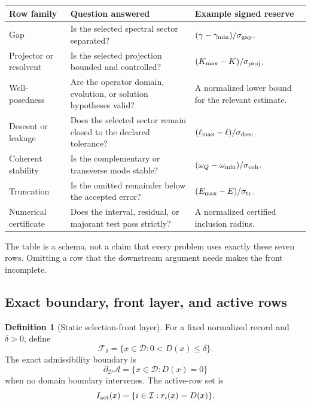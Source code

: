\documentclass[11pt]{article}
\theoremstyle{definition}
\newtheorem{definition}[theorem]{Definition}
\theoremstyle{remark}
\newcommand{\cA}{\mathcal A}
\newcommand{\cD}{\mathcal D}
\newcommand{\cF}{\mathcal F}
\newcommand{\cI}{\mathcal I}
\begin{document}
\begin{center}
\begin{tabularx}{\textwidth}{@{}L{0.22\textwidth}Y Y@{}}
\toprule
Row family & Question answered & Example signed reserve \\
\midrule
Gap
& Is the selected spectral sector separated?
& \((\gamma-\gamma_{\min})/\sigma_{\rm gap}\).\\

Projector or resolvent
& Is the selected projection bounded and controlled?
& \((K_{\max}-K)/\sigma_{\rm proj}\).\\

Well-posedness
& Are the operator domain, evolution, or solution hypotheses valid?
& A normalized lower bound for the relevant estimate.\\

Descent or leakage
& Does the selected sector remain closed to the declared tolerance?
& \((\ell_{\max}-\ell)/\sigma_{\rm desc}\).\\

Coherent stability
& Is the complementary or transverse mode stable?
& \((\omega_Q-\omega_{\min})/\sigma_{\rm coh}\).\\

Truncation
& Is the omitted remainder below the accepted error?
& \((E_{\max}-E)/\sigma_{\rm tr}\).\\

Numerical certificate
& Does the interval, residual, or majorant test pass strictly?
& A normalized certified inclusion radius.\\
\bottomrule
\end{tabularx}
\end{center}

The table is a schema, not a claim that every problem uses exactly these
seven rows.  Omitting a row that the downstream argument needs makes the
front incomplete.

\subsection{Exact boundary, front layer, and active rows}

\begin{definition}[Static selection-front layer]
\label{def:frontlayer}
For a fixed normalized record and \(\delta>0\), define
\[
 \cF_\delta
 =
 \{x\in\cD:0<D(x)\le\delta\}.
\]
The exact admissibility boundary is
\[
 \partial_{\cD}\cA
 =
 \{x\in\cD:D(x)=0\}
\]
when no domain boundary intervenes.  The active-row set is
\[
 I_{\rm act}(x)
 =
 \{i\in\cI:r_i(x)=D(x)\}.
\]
\end{definition}
\end{document}
